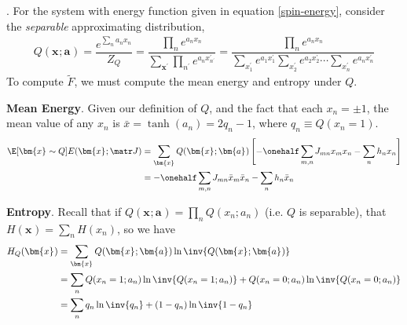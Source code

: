 \documentclass[11pt]{article}
\renewcommand\vec[2][]{\bm{#2}_{#1}}
\newcommand\myspace[1][]{\vspace{#1\bigskipamount}}
\newcommand\p{\Needspace{10\baselineskip} \noindent}
\begin{document}
\myspace
\p {}. For the system with energy function given in equation \ref{spin-energy}, consider the \textit{separable} approximating distribution,
\begin{align}
	Q(\vec x; \vec a) = \dfrac{   e^{\sum_n a_n x_n}  }{  Z_Q  } 
	= \dfrac{ \prod_{n} e^{a_n x_n} }{ \sum_{\vec{x}^{\prime}} \prod_{n^{\prime}} e^{a_n x^{\prime}_{n^\prime}} } 
	=  \dfrac{ \prod_{n} e^{a_n x_n} }{
		 \sum_{x^{\prime}_1} e^{a_1 x^{\prime}_1} \sum_{x^{\prime}_2} e^{a_2 x^{\prime}_2}  \cdots \sum_{x^{\prime}_n} e^{a_n x^{\prime}_n} 
	} 
\end{align}
To compute $\widetilde F$, we must compute the mean energy and entropy under $Q$.
\begin{compactitem}[$\rightarrow$]
	
	\item \textbf{Mean Energy}. Given our definition of $Q$, and the fact that each $x_n = \pm 1$, the mean value of any $x_n$ is $\bar{x} = \tanh(a_n) = 2 q_n - 1$, where $q_n \equiv Q(x_n = 1)$. 
	\begin{align}
		\E[\vec x \sim Q]{E(\vec x; \matr J)}
		&= \sum_{\vec{x}} Q(\vec x; \vec a) \left[ 
			-\onehalf \sum_{m,n} J_{mn} x_m x_n - \sum_n h_n x_n
		\right] \\
		&= -\onehalf \sum_{m,n} J_{mn} \bar x_m \bar x_n - \sum_n h_n \bar x_n
	\end{align}
	
	
	\begin{comment}
	\item \textbf{Mean Energy}. First, it's important to recognize that our definition of $Q$ necessarily alters our interpretation of $E$, since $Q$ is meant to approximate $P \propto e^{-\beta E}$. My impression is that, during the subsequent calculations under the approximate distribution $Q$, we should replace any instances of $E$ by the form of $E$ implied by the definition of $Q$, which I'll denote as $E_Q$ as a reminder.
	\begin{align}
	\E[\vec x \sim Q]{E_Q(\vec x; \matr{J})}
	&= \sum_{\vec x} Q(\vec x; \vec a) E_Q(\vec x; \matr J) \\
	&= \sum_{\vec x} Q(\vec x; \vec a) \left( -  \sum_n  h_n x_n \right)
	\end{align}
	\end{comment}
	
	\item \textbf{Entropy}. Recall that if $Q(\vec x; \vec a) = \prod_n Q(x_n; a_n)$ (i.e. $Q$ is separable), that $H(\vec{x}) = \sum_n H(x_n)$, so we have
	\begin{align}
	H_Q(\vec{x}) &= \sum_{\vec{x}} Q(\vec x; \vec a) \ln \inv{Q(\vec x; \vec a)} \\
		&= \sum_n Q(x_n = 1; a_n) \ln \inv{Q(x_n = 1; a_n)} +   Q(x_n = 0; a_n) \ln \inv{ Q(x_n = 0; a_n)} \\
		&= \sum_n q_n \ln \inv{q_n} +  (1 - q_n) \ln \inv{ 1 - q_n }
	\end{align}
\end{compactitem}
\end{document}
